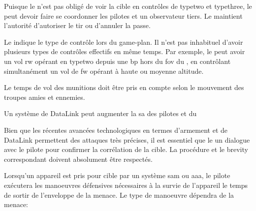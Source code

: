 \begin{e1}
	\item Puisque le \ja{} n'est pas obligé de voir la cible en contrôles de \gls{typetwo} et \gls{typethree}, le \ja{} peut devoir faire se coordonner les pilotes et un observateur tiers. Le \ja{} maintient l'autorité d'autoriser le tir ou d'annuler la passe.
	
	\item Le \ja{} indique le type de contrôle lors du game-plan. Il n'est pas inhabituel d'avoir plusieurs types de contrôles effectifs en même temps. Par exemple, le \ja{} peut avoir un vol \gls{rw} opérant en \gls{typetwo} depuis une \gls{bp} hors du \gls{fov} du \ja{}, en contrôlant simultanément un vol de \gls{fw} opérant à haute ou moyenne altitude.
	
	\item Le temps de vol des munitions doit être pris en compte selon le mouvement des troupes amies et ennemies.
	
	\item Un système de DataLink peut augmenter la \gls{sa} des pilotes et du \ja{}
	
	\item Bien que les récentes avancées technologiques en termes d'armement et de DataLink permettent des attaques très précises, il est essentiel que le \ja{} un dialogue avec le pilote pour confirmer la corrélation de la cible. La procédure et le brevity correspondant doivent absolument être respectés.
	
	
	\item Lorsqu'un appareil est pris pour cible par un système \gls{sam} ou \gls{aaa}, le pilote exécutera les manoeuvres défensives nécessaires à la survie de l'appareil le temps de sortir de l'enveloppe de la menace. Le type de manoeuvre dépendra de la menace:
	
	\begin{e2}
		
		
		
\end{e2}
\end{e1}
